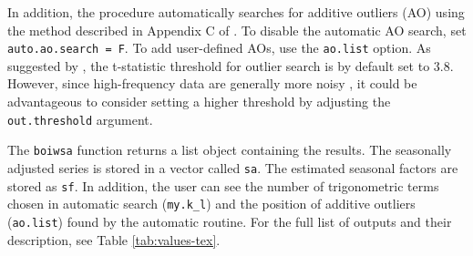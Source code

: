 \FloatBarrier

\FloatBarrier

In addition, the procedure automatically searches for additive outliers (AO) using the method described in Appendix C of \citet{findley1998}. To disable the automatic AO search, set \texttt{auto.ao.search\ =\ F}. To add user-defined AOs, use the \texttt{ao.list} option. As suggested by \citet{findley1998}, the t-statistic threshold for outlier search is by default set to \(3.8\). However, since high-frequency data are generally more noisy \citep{proietti2023seasonality}, it could be advantageous to consider setting a higher threshold by adjusting the \texttt{out.threshold} argument.

The \texttt{boiwsa} function returns a list object containing the results. The seasonally adjusted series is stored in a vector called \texttt{sa}. The estimated seasonal factors are stored as \texttt{sf}. In addition, the user can see the number of trigonometric terms chosen in automatic search (\texttt{my.k\_l}) and the position of additive outliers (\texttt{ao.list}) found by the automatic routine. For the full list of outputs and their description, see Table \ref{tab:values-tex}.

\FloatBarrier
\begin{table}[H]
\centering
\caption{\label{tab:values-tex}Output values for boiwsa}
\centering
{}
\end{table}
\FloatBarrier

